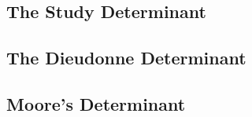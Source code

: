 \subsection{The Study Determinant}

\subsection{The Dieudonne Determinant}

\subsection{Moore's Determinant}

